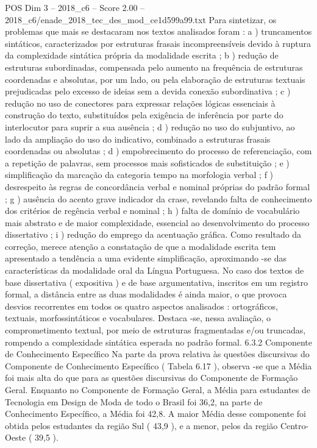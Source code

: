 \begin{textsample}{POS Dim 3 – 2018\_c6 – Score 2.00 – 2018\_c6/enade\_2018\_tec\_des\_mod\_ce1d599a99.txt}
Para sintetizar, os problemas que mais se destacaram nos textos analisados foram : a ) truncamentos sintáticos, caracterizados por estruturas frasais incompreensíveis devido à ruptura da complexidade sintática própria da modalidade escrita ; b ) redução de estruturas subordinadas, compensada pelo aumento na frequência de estruturas coordenadas e absolutas, por um lado, ou pela elaboração de estruturas textuais prejudicadas pelo excesso de ideias sem a devida conexão subordinativa ; c ) redução no uso de conectores para expressar relações lógicas essenciais à construção do texto, substituídos pela exigência de inferência por parte do interlocutor para suprir a sua ausência ; d ) redução no uso do subjuntivo, ao lado da ampliação do uso do indicativo, combinado a estruturas frasais coordenadas ou absolutas ; d ) empobrecimento do processo de referenciação, com a repetição de palavras, sem processos mais sofisticados de substituição ; e ) simplificação da marcação da categoria tempo na morfologia verbal ; f ) desrespeito às regras de concordância verbal e nominal próprias do padrão formal ; g ) ausência do acento grave indicador da crase, revelando falta de conhecimento dos critérios de regência verbal e nominal ; h ) falta de domínio de vocabulário mais abstrato e de maior complexidade, essencial ao desenvolvimento do processo dissertativo ; i ) redução do emprego da acentuação gráfica.
Como resultado da correção, merece atenção a constatação de que a modalidade escrita tem apresentado a tendência a uma evidente simplificação, aproximando -se das características da modalidade oral da Língua Portuguesa.
No caso dos textos de base dissertativa ( expositiva ) e de base argumentativa, inscritos em um registro formal, a distância entre as duas modalidades é ainda maior, o que provoca desvios recorrentes em todos os quatro aspectos analisados : ortográficos, textuais, morfossintáticos e vocabulares.
Destaca -se, nessa avaliação, o comprometimento textual, por meio de estruturas fragmentadas e/ou truncadas, rompendo a complexidade sintática esperada no padrão formal. 6.3.2 Componente de Conhecimento Específico Na parte da prova relativa às questões discursivas do Componente de Conhecimento Específico ( Tabela 6.17 ), observa -se que a Média foi mais alta do que para as questões discursivas do Componente de Formação Geral.
Enquanto no Componente de Formação Geral, a Média para estudantes de Tecnologia em Design de Moda de todo o Brasil foi 36,2, na parte de Conhecimento Específico, a Média foi 42,8.
A maior Média desse componente foi obtida pelos estudantes da região Sul ( 43,9 ), e a menor, pelos da região Centro-Oeste ( 39,5 ).

\end{textsample}
